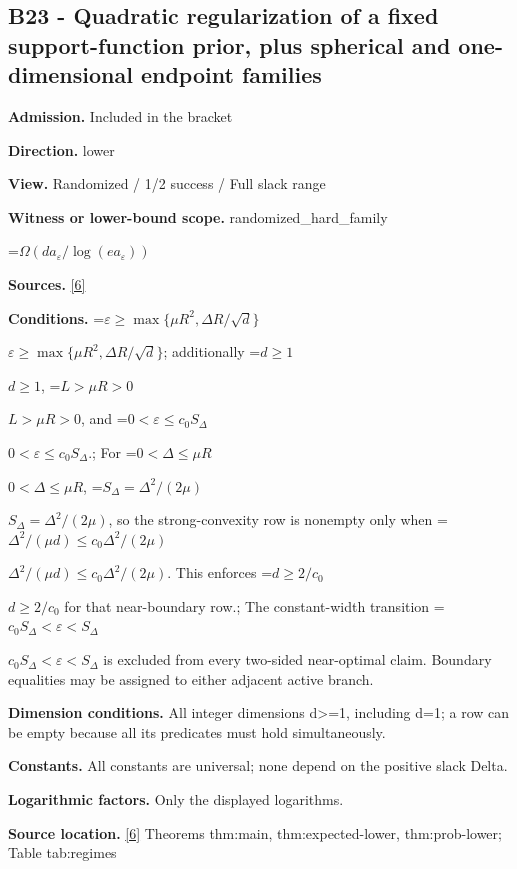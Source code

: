 \documentclass[10pt,a4paper]{article}
\newcommand{\AtlasMath}[1]{\par\begingroup\centering\setbox0=\hbox{$\displaystyle #1$}\ifdim\wd0>1.4\linewidth\typeout{ATLAS WIDE FORMULA: \the\wd0}\fi\ifdim\wd0>\linewidth\resizebox{\linewidth}{!}{\box0}\else\box0\fi\par\endgroup}
\newcommand{\AtlasInlineMath}[1]{\begingroup\setbox0=\hbox{$#1$}\ifdim\wd0>.4\linewidth\endgroup\AtlasMath{#1}\else\endgroup$#1$\fi}
\begin{document}
\subsection{B23 - Quadratic regularization of a fixed support-function prior, plus spherical and one-dimensional endpoint families}


\textbf{Admission.} Included in the bracket



\textbf{Direction.} lower



\textbf{View.} Randomized / 1/2 success / Full slack range



\textbf{Witness or lower-bound scope.} randomized\_hard\_family



\AtlasMath{\Omega(da_\varepsilon/\log(ea_\varepsilon))}


\textbf{Sources.} \href{https://github.com/WU-Wendao/Colombo/blob/main/colombo_sensorium/Complexity_altas/data/sources/colombo/U10/manuscript.pdf}{[6]}



\textbf{Conditions.} \AtlasInlineMath{\varepsilon\ge\max\{\mu R^2,\Delta R/\sqrt d\}}; additionally \AtlasInlineMath{d\ge1}, \AtlasInlineMath{L>\mu R>0}, and \AtlasInlineMath{0<\varepsilon\le c_0S_\Delta}.; For \AtlasInlineMath{0<\Delta\le\mu R}, \AtlasInlineMath{S_\Delta=\Delta^2/(2\mu)}, so the strong-convexity row is nonempty only when \AtlasInlineMath{\Delta^2/(\mu d)\le c_0\Delta^2/(2\mu)}. This enforces \AtlasInlineMath{d\ge2/c_0} for that near-boundary row.; The constant-width transition \AtlasInlineMath{c_0S_\Delta<\varepsilon<S_\Delta} is excluded from every two-sided near-optimal claim. Boundary equalities may be assigned to either adjacent active branch.



\textbf{Dimension conditions.} All integer dimensions d>=1, including d=1; a row can be empty because all its predicates must hold simultaneously.



\textbf{Constants.} All constants are universal; none depend on the positive slack Delta.



\textbf{Logarithmic factors.} Only the displayed logarithms.



\textbf{Source location.} \href{https://github.com/WU-Wendao/Colombo/blob/main/colombo_sensorium/Complexity_altas/data/sources/colombo/U10/manuscript.pdf}{[6]} Theorems thm:main, thm:expected-lower, thm:prob-lower; Table tab:regimes
\end{document}

